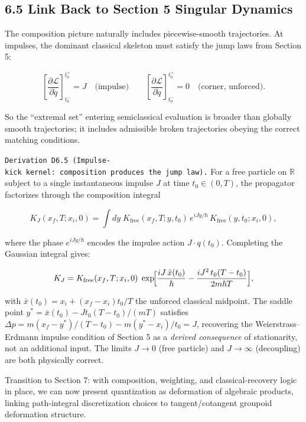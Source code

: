\documentclass[
]{article}
\begin{document}
\hypertarget{link-back-to-section-5-singular-dynamics}{%
\subsection{6.5 Link Back to Section 5 Singular
Dynamics}\label{link-back-to-section-5-singular-dynamics}}

The composition picture naturally includes piecewise-smooth
trajectories. At impulses, the dominant classical skeleton must satisfy
the jump laws from Section 5:

\[
\left[\frac{\partial\mathcal L}{\partial\dot q}\right]_{t_0^-}^{t_0^+}=J
\quad\text{(impulse)}
\qquad
\left[\frac{\partial\mathcal L}{\partial\dot q}\right]_{t_0^-}^{t_0^+}=0
\quad\text{(corner, unforced)}.
\]

So the ``extremal set'' entering semiclassical evaluation is broader
than globally smooth trajectories; it includes admissible broken
trajectories obeying the correct matching conditions.

\texttt{Derivation\ D6.5\ (Impulse-kick\ kernel:\ composition\ produces\ the\ jump\ law).}
For a free particle on \(\mathbb R\) subject to a single instantaneous
impulse \(J\) at time \(t_0\in(0,T)\), the propagator factorizes through
the composition integral

\[
K_J(x_f,T;x_i,0)=\int dy\;K_{\mathrm{free}}(x_f,T;y,t_0)\,e^{iJy/\hbar}\,K_{\mathrm{free}}(y,t_0;x_i,0),
\]

where the phase \(e^{iJy/\hbar}\) encodes the impulse action
\(J\cdot q(t_0)\). Completing the Gaussian integral gives:

\[
K_J=K_{\mathrm{free}}(x_f,T;x_i,0)\;\exp\!\Bigl[\frac{iJ\,\bar x(t_0)}{\hbar}-\frac{iJ^2\,t_0(T-t_0)}{2m\hbar T}\Bigr],
\]

with \(\bar x(t_0)=x_i+(x_f-x_i)t_0/T\) the unforced classical midpoint.
The saddle point \(y^\ast=\bar x(t_0)-Jt_0(T-t_0)/(mT)\) satisfies
\(\Delta p=m(x_f-y^\ast)/(T-t_0)-m(y^\ast-x_i)/t_0=J\), recovering the
Weierstrass--Erdmann impulse condition of Section 5 as a \emph{derived
consequence} of stationarity, not an additional input. The limits
\(J\to 0\) (free particle) and \(J\to\infty\) (decoupling) are both
physically correct.

Transition to Section 7: with composition, weighting, and
classical-recovery logic in place, we can now present quantization as
deformation of algebraic products, linking path-integral discretization
choices to tangent/cotangent groupoid deformation structure.
\end{document}
